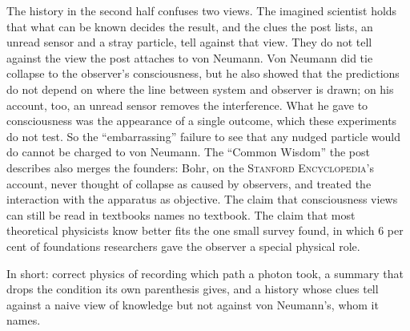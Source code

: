 \begin{afterword}
The history in the second half confuses two views. The imagined scientist holds that what can be known decides the result, and the clues the post lists, an unread sensor and a stray particle, tell against that view. They do not tell against the view the post attaches to von Neumann. Von Neumann did tie collapse to the observer's consciousness, but he also showed that the predictions do not depend on where the line between system and observer is drawn; on his account, too, an unread sensor removes the interference. What he gave to consciousness was the appearance of a single outcome, which these experiments do not test. So the ``embarrassing'' failure to see that any nudged particle would do cannot be charged to von Neumann. The ``Common Wisdom'' the post describes also merges the founders: Bohr, on the \textsc{Stanford Encyclopedia}'s account, never thought of collapse as caused by observers, and treated the interaction with the apparatus as objective. The claim that consciousness views can still be read in textbooks names no textbook. The claim that most theoretical physicists know better fits the one small survey found, in which 6 per cent of foundations researchers gave the observer a special physical role.

In short: correct physics of recording which path a photon took, a summary that drops the condition its own parenthesis gives, and a history whose clues tell against a naive view of knowledge but not against von Neumann's, whom it names.
\end{afterword}
